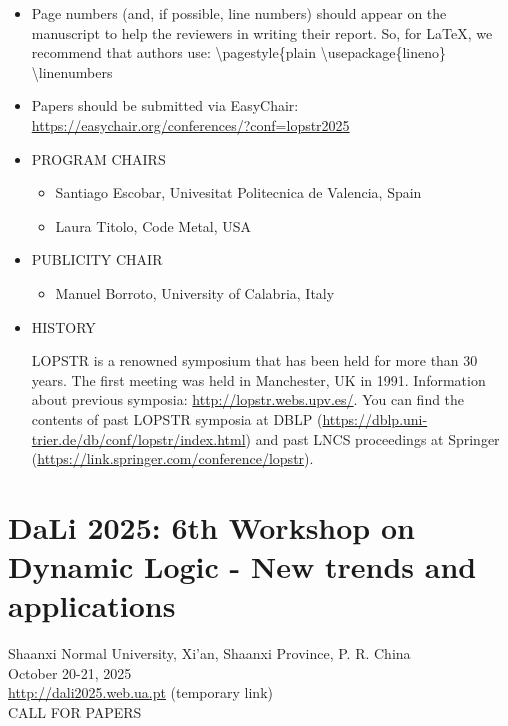 \documentclass[prodmode,acmtecs]{acmsmall} %
\begin{document}
\begin{itemize}
\item  Page numbers (and, if possible, line numbers) should appear on the manuscript to help the reviewers in writing their report. So, for LaTeX, we recommend that authors use: \textbackslash{}pagestyle\{plain \textbackslash{}usepackage\{lineno\} \textbackslash{}linenumbers 
 
\item  Papers should be submitted via EasyChair: \href{https://easychair.org/conferences/?conf=lopstr2025}{https://easychair.org/conferences/?conf=lopstr2025} 
 
\item  PROGRAM CHAIRS 
 
\begin{itemize}\item  Santiago Escobar, Univesitat Politecnica de Valencia, Spain
\item  Laura Titolo, Code Metal, USA
\end{itemize} 
\item  PUBLICITY CHAIR 
 
\begin{itemize}\item  Manuel Borroto, University of Calabria, Italy
\end{itemize} 
\item  HISTORY 
 
  LOPSTR is a renowned symposium that has been held for more than 30 years. The first meeting was held in Manchester, UK in 1991. Information about previous symposia: \href{http://lopstr.webs.upv.es/}{http://lopstr.webs.upv.es/}. You can find the contents of past LOPSTR symposia at DBLP (\href{https://dblp.uni-trier.de/db/conf/lopstr/index.html}{https://dblp.uni-trier.de/db/conf/lopstr/index.html}) and past LNCS proceedings at Springer (\href{https://link.springer.com/conference/lopstr}{https://link.springer.com/conference/lopstr}). 
 
\end{itemize}\section{DaLi 2025: 6th Workshop on Dynamic Logic - New trends and applications}\label{DaLi2025}  Shaanxi Normal University, Xi'an, Shaanxi Province, P. R. China\\ 
  October 20-21, 2025\\ 
  \href{http://dali2025.web.ua.pt}{http://dali2025.web.ua.pt} (temporary link)  \\ 
CALL FOR PAPERS 
\end{document}

